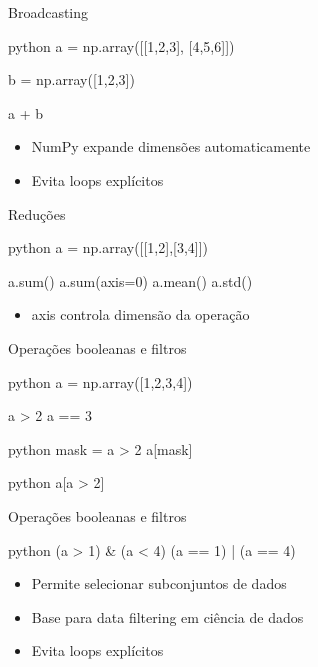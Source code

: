 \documentclass[xcolor=dvipsnames,t,aspectratio=169]{beamer}
\newcommand{\highlight}[1]{{\color{nes_dark_orange} #1}}
\begin{document}
\begin{frame}[c, fragile]{Broadcasting}

\begin{code}[Exemplo]{python}
a = np.array([[1,2,3],
              [4,5,6]])

b = np.array([1,2,3])

a + b
\end{code}

\begin{itemize}
\item NumPy expande dimensões automaticamente
\item Evita loops explícitos
\end{itemize}

\end{frame}

\begin{frame}[c, fragile]{Reduções}

\begin{code}[Exemplo]{python}
a = np.array([[1,2],[3,4]])

a.sum()
a.sum(axis=0)
a.mean()
a.std()
\end{code}

\begin{itemize}
\item axis controla dimensão da operação
\end{itemize}

\end{frame}

\begin{frame}[c, fragile]{Operações booleanas e filtros}

\begin{code}[Comparações]{python}
a = np.array([1,2,3,4])

a > 2
a == 3
\end{code}

\begin{code}{python}
mask = a > 2
a[mask]
\end{code}

\begin{code}{python}
a[a > 2]
\end{code}

\end{frame}

\begin{frame}[c, fragile]{Operações booleanas e filtros}

\begin{code}[Combinações]{python}
(a > 1) & (a < 4)
(a == 1) | (a == 4)
\end{code}

\begin{itemize}
\item Permite selecionar subconjuntos de dados
\item Base para \highlight{data filtering} em ciência de dados
\item Evita loops explícitos
\end{itemize}

\end{frame}
\end{document}
